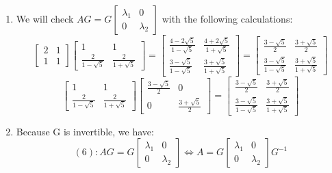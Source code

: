 \begin{enumerate}
    \item We will check \(
    AG=G
    \begin{bmatrix}
    \lambda_{1} & 0 \\
    0 & \lambda_{2}
    \end{bmatrix}\) with the following calculations: 
    \[
    \begin{bmatrix}
    2 & 1  \\
    1 & 1  
    \end{bmatrix}
    \begin{bmatrix}
    1 & 1 \\ 
    \frac{2}{1 - \sqrt{5}} & \frac{2}{1 + \sqrt{5}}  
    \end{bmatrix} = 
    \begin{bmatrix}
    \frac{4- 2\sqrt{5}}{1 - \sqrt{5}} & \frac{4+ 2\sqrt{5}}{1 + \sqrt{5}}   \\
    \frac{3- \sqrt{5}}{1 - \sqrt{5}} & \frac{3+ \sqrt{5}}{1 + \sqrt{5}}  
    \end{bmatrix} = \begin{bmatrix}
    \frac{3- \sqrt{5}}{2} & \frac{3+ \sqrt{5}}{2}   \\
    \frac{3- \sqrt{5}}{1 - \sqrt{5}} & \frac{3+ \sqrt{5}}{1 + \sqrt{5}}  
    \end{bmatrix}\]
    \[
    \begin{bmatrix}
    1 & 1 \\ 
    \frac{2}{1 - \sqrt{5}} & \frac{2}{1 + \sqrt{5}}  
    \end{bmatrix} \begin{bmatrix}
    \frac{3- \sqrt{5}}{2} & 0  \\
    0 & \frac{3+ \sqrt{5}}{2}  
    \end{bmatrix} = 
    \begin{bmatrix}
    \frac{3- \sqrt{5}}{2} & \frac{3+ \sqrt{5}}{2}   \\
    \frac{3- \sqrt{5}}{1 - \sqrt{5}} & \frac{3+ \sqrt{5}}{1 + \sqrt{5}}  
    \end{bmatrix}\]
    
    
    \item Because G is invertible, we have:
    \[ (6):
    AG=G
    \begin{bmatrix}
    \lambda_{1} & 0 \\
    0 & \lambda_{2}
    \end{bmatrix}  \iff
    A=G
    \begin{bmatrix}
    \lambda_{1} & 0 \\
    0 & \lambda_{2}
    \end{bmatrix}
    G^{-1} \]
    

\end{enumerate}
